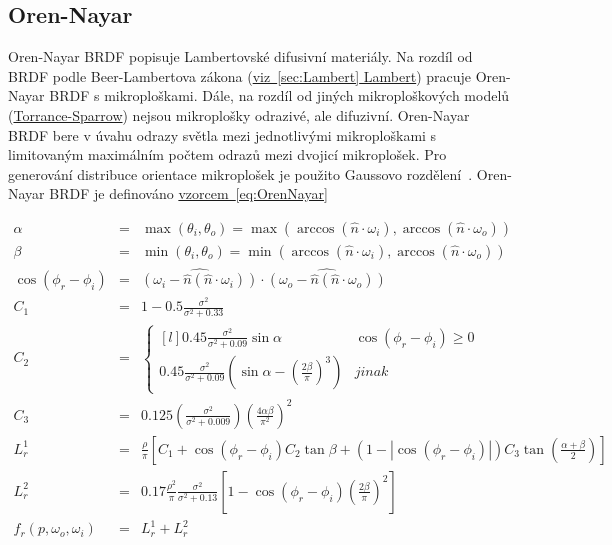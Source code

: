 \documentclass[czech,master]{diploma}
\newcommand{\uvec}[1]{\hat{#1}}
\newcommand{\point}{p}
\newcommand{\brdf}{f_r\left(\point,\omega_{o},\omega_{i}\right)}
\newcommand{\normVec}{\uvec{n}}
\newcommand{\inVec}{\omega_{i}}
\newcommand{\outVec}{\omega_{o}}
\newcommand{\alb}{\rho}
\newcommand{\rough}{\sigma}
\begin{document}
\subsection{Oren-Nayar}
Oren-Nayar BRDF popisuje Lambertovské difusivní materiály. Na rozdíl od BRDF podle Beer-Lambertova zákona (\hyperref[sec:Lambert]{viz~\ref{sec:Lambert} Lambert}) pracuje Oren-Nayar BRDF s mikroploškami. Dále, na rozdíl od jiných mikroploškových modelů (\hyperref[sec:torrancesparrow]{Torrance-Sparrow}) nejsou mikroplošky odrazivé, ale difuzivní. Oren-Nayar BRDF bere v úvahu odrazy světla mezi jednotlivými mikroploškami s limitovaným maximálním počtem odrazů mezi dvojicí mikroplošek. Pro generování distribuce orientace mikroplošek je použito Gaussovo rozdělení~\cite{BRDFOverview, OrenNayar}. Oren-Nayar BRDF je definováno \hyperref[eq:OrenNayar]{vzorcem~\ref{eq:OrenNayar}}

\newcommand{\cosphiri}{\cos\left(\phi_r-\phi_i\right)}

\begin{eqnarray}
  \alpha & = & \max(\theta_i , \theta_o) = \max(\arccos(\normVec\cdot\inVec), \arccos(\normVec\cdot\outVec)) \nonumber \\
  \beta & = & \min(\theta_i , \theta_o) = \min(\arccos(\normVec\cdot\inVec), \arccos(\normVec\cdot\outVec)) \nonumber \\
  \cosphiri & = & \widehat{\left( \inVec - \normVec(\normVec\cdot\inVec) \right)} \cdot \widehat{\left( \outVec - \normVec(\normVec\cdot\outVec)  \right)} \nonumber \\
  C_1 & = & 1-0.5\frac{\rough^{2}}{\rough^{2} + 0.33} \nonumber \\
  C_2 & = & \left\{\begin{matrix*}[l] 0.45\frac{\rough^{2}}{\rough^{2}+0.09}\sin\alpha & \cosphiri \geq 0\\ 0.45\frac{\rough^{2}}{\rough^2+0.09}\left(\sin\alpha-\left(\frac{2\beta}{\pi}\right)^{3}\right) & jinak \end{matrix*}\right. \nonumber \\
  C_3 & = & 0.125\left(\frac{\rough^2}{\rough^2 + 0.009}\right)\left(\frac{4\alpha\beta}{\pi^2}\right)^{2} \nonumber \\
  L^{1}_{r} & = & \frac{\alb}{\pi}\left[C_1 + \cosphiri C_2\tan\beta + \left( 1-\left | \cosphiri  \right | \right)C_3\tan \left(\frac{\alpha+\beta}{2}\right)\right] \nonumber \\
  L^{2}_{r} & = & 0.17\frac{\alb^{2}}{\pi}\frac{\rough^{2}}{\rough^2+0.13}\left[1 - \cosphiri  \left(\frac{2\beta}{\pi}\right)^{2} \right] \nonumber \\
  \brdf & = & L^{1}_{r} + L^{2}_{r} \label{eq:OrenNayar}
\end{eqnarray}
\end{document}

